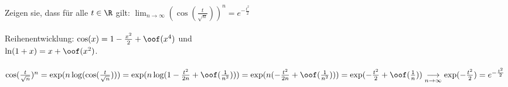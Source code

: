 \begin{example}
	Zeigen sie, dass für alle $t \in \R$ gilt: $\lim_{n \to \infty} ( \cos ( \frac{t}{\sqrt{n}} ) )^n = e^{-\frac{t^2}{2}}$\\ \\
	Reihenentwicklung: $\cos (x) = 1 - \frac{x^2}{2} + \oof (x^4 )$ und\\$\ln (1+x) = x + \oof (x^2 )$.\\ \\
    $\cos ( \frac{t}{\sqrt{n}} )^n = \exp ( n \log ( \cos ( \frac{t}{\sqrt{n}}  ) ) )
						 = \exp ( n \log ( 1 - \frac{t^2}{2n} + \oof ( \frac{1}{n^2} ) ) )\\
						 = \exp ( n ( - \frac{t^2}{2n} + \oof ( \frac{1}{n^2} ) ) )
						 = \exp ( - \frac{t^2}{2} + \oof ( \frac{1}{n} ) )\\
						  \underset{n \to \infty}{\longrightarrow} \exp ( - \frac{t^2}{2} ) = e^{-\frac{t^2}{2}}$
\end{example}